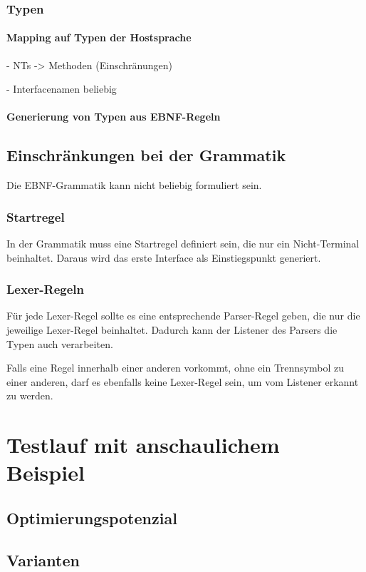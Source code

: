 \documentclass[../InterneDSLs.tex]{subfiles}
\begin{document}
\subsection{Typen}

\subsubsection{Mapping auf Typen der Hostsprache}
- NTs -> Methoden (Einschränungen)

- Interfacenamen beliebig

\subsubsection{Generierung von Typen aus EBNF-Regeln}


\section{Einschränkungen bei der Grammatik}
Die EBNF-Grammatik kann nicht beliebig formuliert sein.

\subsection{Startregel}
In der Grammatik muss eine Startregel definiert sein, die nur ein Nicht-Terminal beinhaltet. Daraus wird das erste Interface als Einstiegspunkt generiert.

\subsection{Lexer-Regeln}
Für jede Lexer-Regel sollte es eine entsprechende Parser-Regel geben, die nur die jeweilige Lexer-Regel beinhaltet. Dadurch kann der Listener des Parsers die Typen auch verarbeiten.

Falls eine Regel innerhalb einer anderen vorkommt, ohne ein Trennsymbol zu einer anderen, darf es ebenfalls keine Lexer-Regel sein, um vom Listener erkannt zu werden.


\chapter{Testlauf mit anschaulichem Beispiel}


\section{Optimierungspotenzial}


\section{Varianten}
\end{document}

